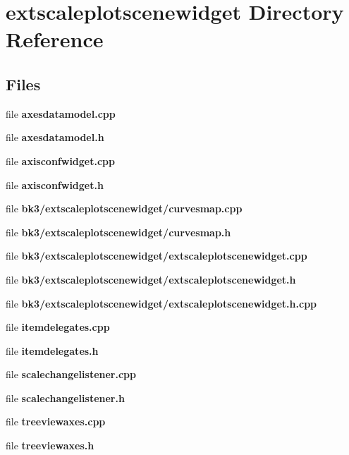 \section{extscaleplotscenewidget Directory Reference}
\label{dir_1fabc7886d7bde691aa86707f35aa8fc}
\subsection*{Files}
\begin{DoxyCompactItemize}
\item 
file {\bf axesdatamodel.\+cpp}
\item 
file {\bf axesdatamodel.\+h}
\item 
file {\bf axisconfwidget.\+cpp}
\item 
file {\bf axisconfwidget.\+h}
\item 
file {\bf bk3/extscaleplotscenewidget/curvesmap.\+cpp}
\item 
file {\bf bk3/extscaleplotscenewidget/curvesmap.\+h}
\item 
file {\bf bk3/extscaleplotscenewidget/extscaleplotscenewidget.\+cpp}
\item 
file {\bf bk3/extscaleplotscenewidget/extscaleplotscenewidget.\+h}
\item 
file {\bf bk3/extscaleplotscenewidget/extscaleplotscenewidget.\+h.\+cpp}
\item 
file {\bf itemdelegates.\+cpp}
\item 
file {\bf itemdelegates.\+h}
\item 
file {\bf scalechangelistener.\+cpp}
\item 
file {\bf scalechangelistener.\+h}
\item 
file {\bf treeviewaxes.\+cpp}
\item 
file {\bf treeviewaxes.\+h}
\end{DoxyCompactItemize}
